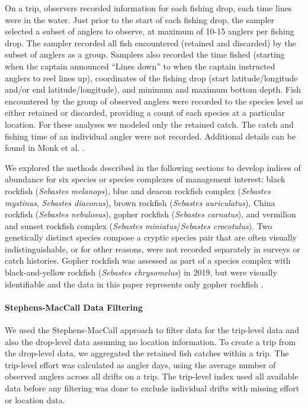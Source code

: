 \documentclass[
  authoryear,
  preprint,
  3p]{elsarticle}
\let\oldparagraph\paragraph
\renewcommand{\paragraph}[1]{\oldparagraph{#1}\mbox{}}
\begin{document}
On a trip, observers recorded information for each fishing drop, each
time lines were in the water. Just prior to the start of each fishing
drop, the sampler selected a subset of anglers to observe, at maximum of
10-15 anglers per fishing drop. The sampler recorded all fish
encountered (retained and discarded) by the subset of anglers as a
group. Samplers also recorded the time fished (starting when the captain
announced ``Lines down'' to when the captain instructed anglers to reel
lines up), coordinates of the fishing drop (start latitude/longitude
and/or end latitude/longitude), and minimum and maximum bottom depth.
Fish encountered by the group of observed anglers were recorded to the
species level as either retained or discarded, providing a count of each
species at a particular location. For these analyses we modeled only the
retained catch. The catch and fishing time of an individual angler were
not recorded. Additional details can be found in Monk et al.
\citeyearpar{Monk:2014:DRD}.

We explored the methods described in the following sections to develop
indices of abundance for six species or species complexes of management
interest: black rockfish (\emph{Sebastes melanops}), blue and deacon
rockfish complex (\emph{Sebastes mystinus}, \emph{Sebastes diaconus}),
brown rockfish (\emph{Sebastes auriculatus}), China rockfish
(\emph{Sebastes nebulosus}), gopher rockfish (\emph{Sebastes carnatus}),
and vermilion and sunset rockfish complex (\emph{Sebastes
miniatus}/\emph{Sebastes crocotulus}). Two genetically distinct species
compose a cryptic species pair that are often visually
indistinguishable, or for other reasons, were not recorded separately in
surveys or catch histories. Gopher rockfish was assessed as part of a
species complex with black-and-yellow rockfish (\emph{Sebastes
chrysomelus}) in 2019, but were visually identifiable and the data in
this paper represents only gopher rockfish \citep{Monk:2019:CSG}.

\hypertarget{stephens-maccall-data-filtering}{%
\paragraph{Stephens-MacCall Data
Filtering}\label{stephens-maccall-data-filtering}}

We used the Stephens-MacCall approach to filter data for the trip-level
data and also the drop-level data assuming no location information. To
create a trip from the drop-level data, we aggregated the retained fish
catches within a trip. The trip-level effort was calculated as angler
days, using the average number of observed anglers across all drifts on
a trip. The trip-level index used all available data before any
filtering was done to exclude individual drifts with missing effort or
location data.
\end{document}
